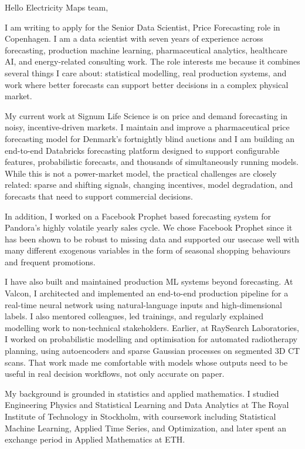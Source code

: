 \documentclass[11pt,a4paper]{moderncv}
\begin{document}
\makecvtitle
Hello Electricity Maps team,

\vspace*{2em}
I am writing to apply for the Senior Data Scientist, Price Forecasting role in Copenhagen. I am a data scientist with seven years of experience across forecasting, production machine learning, pharmaceutical analytics, healthcare AI, and energy-related consulting work. The role interests me because it combines several things I care about: statistical modelling, real production systems, and work where better forecasts can support better decisions in a complex physical market.

\hspace*{2em}
My current work at Signum Life Science is on price and demand forecasting in noisy, incentive-driven markets. I maintain and improve a pharmaceutical price forecasting model for Denmark's fortnightly blind auctions and I am building an end-to-end Databricks forecasting platform designed to support configurable features, probabilistic forecasts, and thousands of simultaneously running models. While this is not a power-market model, the practical challenges are closely related: sparse and shifting signals, changing incentives, model degradation, and forecasts that need to support commercial decisions.

\hspace*{2em}
In addition, I worked on a Facebook Prophet based forecasting system for Pandora's highly volatile yearly sales cycle. We chose Facebook Prophet since it has been shown to be robust to missing data and supported our usecase well with many different exogenous variables in the form of seasonal shopping behaviours and frequent promotions.

\hspace*{2em}
I have also built and maintained production ML systems beyond forecasting. At Valcon, I architected and implemented an end-to-end production pipeline for a real-time neural network using natural-language inputs and high-dimensional labels. I also mentored colleagues, led trainings, and regularly explained modelling work to non-technical stakeholders. Earlier, at RaySearch Laboratories, I worked on probabilistic modelling and optimisation for automated radiotherapy planning, using autoencoders and sparse Gaussian processes on segmented 3D CT scans. That work made me comfortable with models whose outputs need to be useful in real decision workflows, not only accurate on paper.

\hspace*{2em}
My background is grounded in statistics and applied mathematics. I studied Engineering Physics and Statistical Learning and Data Analytics at The Royal Institute of Technology in Stockholm, with coursework including Statistical Machine Learning, Applied Time Series, and Optimization, and later spent an exchange period in Applied Mathematics at ETH.
\end{document}
